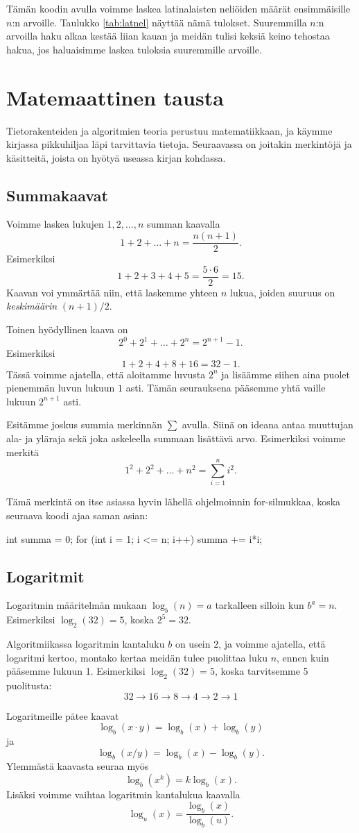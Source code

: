 Tämän koodin avulla voimme laskea latinalaisten neliöiden
määrät ensimmäisille $n$:n arvoille.
Taulukko \ref{tab:latnel} näyttää nämä tulokset.
Suuremmilla $n$:n arvoilla haku alkaa kestää liian kauan
ja meidän tulisi keksiä keino tehostaa hakua,
jos haluaisimme laskea tuloksia suuremmille arvoille.

\section{Matemaattinen tausta}

Tietorakenteiden ja algoritmien teoria perustuu matematiikkaan,
ja käym\-me kirjassa pikkuhiljaa läpi tarvittavia tietoja.
Seuraavassa on joitakin merkintöjä ja käsitteitä, joista on hyötyä
useassa kirjan kohdassa.

\subsection{Summakaavat}

Voimme laskea lukujen $1,2,\dots,n$ summan kaavalla
\[1+2+\dots+n = \frac{n(n+1)}{2}.\]
Esimerkiksi
\[1+2+3+4+5 = \frac{5 \cdot 6}{2}=15.\]
Kaavan voi ymmärtää niin, että laskemme yhteen $n$ lukua,
joiden suuruus on \emph{keskimäärin} $(n+1)/2$.

Toinen hyödyllinen kaava on
\[2^0+2^1+\dots+2^n = 2^{n+1}-1.\]
Esimerkiksi
\[1+2+4+8+16=32-1.\]
Tässä voimme ajatella, että aloitamme luvusta $2^n$
ja lisäämme siihen aina puolet pienemmän luvun lukuun $1$ asti.
Tämän seurauksena pääsemme yhtä vaille lukuun $2^{n+1}$ asti.

Esitämme joskus summia merkinnän $\sum$ avulla.
Siinä on ideana antaa muuttujan ala- ja yläraja sekä
joka askeleella summaan lisättävä arvo.
Esimerkiksi voimme merkitä
\[1^2 + 2^2 + \dots + n^2 = \sum_{i=1}^n i^2.\]

Tämä merkintä on itse asiassa hyvin lähellä ohjelmoinnin
for-silmukkaa, koska seuraava koodi ajaa saman asian:

\begin{code}
int summa = 0;
for (int i = 1; i <= n; i++) {
    summa += i*i;
}
\end{code}

\subsection{Logaritmit}

Logaritmin määritelmän mukaan $\log_b(n)=a$
tarkalleen silloin kun $b^a=n$.
Esimerkiksi $\log_2(32)=5$, koska $2^5=32$.

Algoritmiikassa logaritmin kantaluku $b$ on usein 2,
ja voimme ajatella, että logaritmi kertoo, montako kertaa
meidän tulee puolittaa luku $n$, ennen kuin pääsemme lukuun 1.
Esimerkiksi $\log_2(32)=5$, koska tarvitsemme 5 puolitusta:
\[32 \rightarrow 16 \rightarrow 8 \rightarrow 4 \rightarrow 2 \rightarrow 1\]

Logaritmeille pätee kaavat
\[\log_b(x \cdot y) = \log_b(x)+\log_b(y)\]
ja
\[\log_b(x / y) = \log_b(x)-\log_b(y).\]
Ylemmästä kaavasta seuraa myös
\[\log_b(x^k) = k \log_b(x).\]
Lisäksi voimme vaihtaa logaritmin kantalukua kaavalla
\[\log_u(x) = \frac{\log_b(x)}{\log_b(u)}.\]